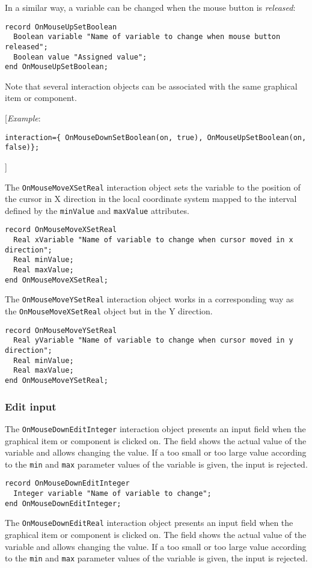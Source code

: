 In a similar way, a variable can be changed when the mouse button is
\emph{released}:

\begin{lstlisting}[language=modelica]
record OnMouseUpSetBoolean
  Boolean variable "Name of variable to change when mouse button released";
  Boolean value "Assigned value";
end OnMouseUpSetBoolean;
\end{lstlisting}
Note that several interaction objects can be associated with the same
graphical item or component.

{[}\emph{Example}:
\begin{lstlisting}[language=modelica]
interaction={ OnMouseDownSetBoolean(on, true), OnMouseUpSetBoolean(on, false)};
\end{lstlisting}
{]}

The \lstinline!OnMouseMoveXSetReal! interaction object sets the variable to the
position of the cursor in X direction in the local coordinate system
mapped to the interval defined by the \lstinline!minValue! and \lstinline!maxValue! attributes.

\begin{lstlisting}[language=modelica]
record OnMouseMoveXSetReal
  Real xVariable "Name of variable to change when cursor moved in x direction";
  Real minValue;
  Real maxValue;
end OnMouseMoveXSetReal;
\end{lstlisting}
The \lstinline!OnMouseMoveYSetReal! interaction object works in a corresponding way
as the \lstinline!OnMouseMoveXSetReal! object but in the Y direction.

\begin{lstlisting}[language=modelica]
record OnMouseMoveYSetReal
  Real yVariable "Name of variable to change when cursor moved in y direction";
  Real minValue;
  Real maxValue;
end OnMouseMoveYSetReal;
\end{lstlisting}
\subsubsection{Edit input}

The \lstinline!OnMouseDownEditInteger! interaction object presents an input field
when the graphical item or component is clicked on. The field shows the
actual value of the variable and allows changing the value. If a too
small or too large value according to the \lstinline!min! and \lstinline!max! parameter values
of the variable is given, the input is rejected.

\begin{lstlisting}[language=modelica]
record OnMouseDownEditInteger
  Integer variable "Name of variable to change";
end OnMouseDownEditInteger;
\end{lstlisting}
The \lstinline!OnMouseDownEditReal! interaction object presents an input field when
the graphical item or component is clicked on. The field shows the
actual value of the variable and allows changing the value. If a too
small or too large value according to the \lstinline!min! and \lstinline!max! parameter values
of the variable is given, the input is rejected.

